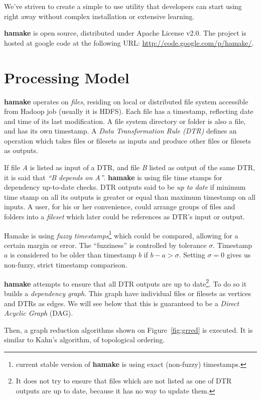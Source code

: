 \documentclass[10pt,conference,letterpaper]{IEEEtran}
\begin{document}
We've striven to create a simple to use utility that developers can
start using right away without complex installation or extensive
learning. 

\textbf{hamake} is open source, distributed under Apache
License v2.0. The project is hosted at google code at the following
URL: \url{http://code.google.com/p/hamake/}.

\section{Processing Model}

\textbf{hamake} operates on \textit{files}, residing on local or
distributed file system accessible from Hadoop job (usually it is
HDFS). Each file has a timestamp, reflecting date and time of its last
modification. A file system directory or folder is also a file, and
has its own timestamp. A \textit{Data Transformation Rule (DTR)}
defines an operation which takes files or filesets as inputs and
produce other files or filesets as outputs.

If file \textit{A} is listed as input of a DTR, and file \textit{B}
listed as output of the same DTR, it is said that \textit{``B depends
  on A''}. \textbf{hamake} is using file time stamps for dependency
up-to-date checks. DTR outputs said to be \textit{up to date} if
minimum time stamp on all its outputs is greater or equal than maximum
timestamp on all inputs. A user, for his or her convenience, could
arrange groups of files and folders into a \emph{fileset} which later
could be references as DTR's input or output.

Hamake is using \textit{fuzzy timestamps}\footnote{current stable
  version of \textbf{hamake} is using exact (non-fuzzy) timestamps.}
which could be compared, allowing for a certain margin or error. The
``fuzziness'' is controlled by tolerance $\sigma$. Timestamp $a$ is
considered to be older than timestamp $b$ if $b-a>\sigma$. Setting
$\sigma=0$ gives us non-fuzzy, strict timestamp comparison.

\textbf{hamake} attempts to ensure that all DTR outputs are up to
date\footnote{It does not try to ensure that files which are not
  listed as one of DTR outputs are up to date, because it has no way
  to update them.}.  To do so it builds a \textit{dependency
  graph}. This graph have individual files or filesets as vertices and
DTRs as edges. We will see below that this is guaranteed to be a
\textit{Direct Acyclic Graph} (DAG).

Then, a graph reduction algorithms shown on Figure~\ref{fig:grred} is
executed. It is similar to Kahn's algorithm\cite{kahn1962topological},
of topological ordering\cite{wiki:topsort}.
\end{document}
